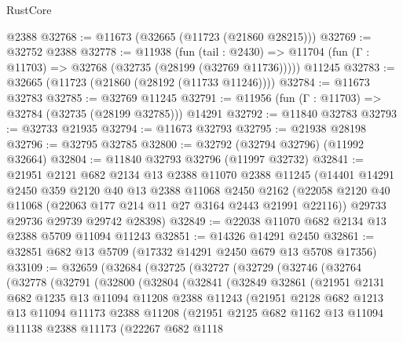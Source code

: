 \begin{lexlean}{RustCore}
\begin{coremodule}
    @2388
@32768 := @11673 (@32665 (@11723 (@21860 @28215)))
@32769 := @32752 @2388
@32778 := @11938
    (fun (tail : @2430) => @11704 (fun (Γ : @11703) => @32768 (@32735 (@28199 (@32769 @11736)))))
    @11245
@32783 := @32665 (@11723 (@21860 (@28192 (@11733 @11246))))
@32784 := @11673 @32783
@32785 := @32769 @11245
@32791 := @11956 (fun (Γ : @11703) => @32784 (@32735 (@28199 @32785))) @14291
@32792 := @11840 @32783
@32793 := @32733 @21935
@32794 := @11673 @32793
@32795 := @21938 @28198
@32796 := @32795 @32785
@32800 := @32792 (@32794 @32796) (@11992 @32664)
@32804 := @11840 @32793 @32796 (@11997 @32732)
@32841 := @21951
    @2121
    @682
    @2134
    @13
    @2388
    @11070
    @2388
    @11245
    (@14401
      @14291
      @2450
      @359
      @2120
      @40
      @13
      @2388
      @11068
      @2450
      @2162
      (@22058 @2120 @40 @11068 (@22063 @177 @214 @11 @27 @3164 @2443 @21991 @22116))
      @29733
      @29736
      @29739
      @29742
      @28398)
@32849 := @22038 @11070 @682 @2134 @13 @2388 @5709 @11094 @11243
@32851 := @14326 @14291 @2450
@32861 := @32851 @682 @13 @5709 (@17332 @14291 @2450 @679 @13 @5708 @17356)
@33109 := @32659
    (@32684
      (@32725
        (@32727
          (@32729
            (@32746
              (@32764
                (@32778
                  (@32791
                    (@32800
                      (@32804
                        (@32841
                          (@32849
                            @32861
                            (@21951
                              @2131
                              @682
                              @1235
                              @13
                              @11094
                              @11208
                              @2388
                              @11243
                              (@21951
                                @2128
                                @682
                                @1213
                                @13
                                @11094
                                @11173
                                @2388
                                @11208
                                (@21951
                                  @2125
                                  @682
                                  @1162
                                  @13
                                  @11094
                                  @11138
                                  @2388
                                  @11173
                                  (@22267
                                    @682
                                    @1118

\end{coremodule}
\end{lexlean}
